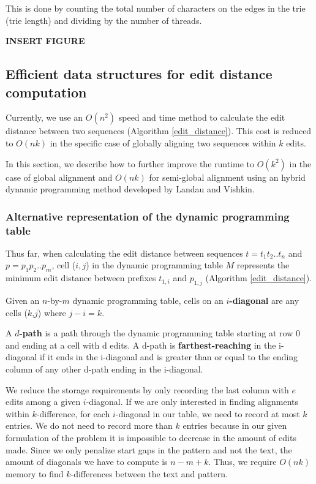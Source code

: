 This is done by counting the total number of characters on the edges in the trie (trie length) and dividing by the number of threads.

{\bf INSERT FIGURE}


\subsection{Efficient data structures for edit distance computation}

Currently, we use an $O(n^2)$ speed and time method to calculate the edit distance between two sequences (Algorithm \ref{edit_distance}).
This cost is reduced to $O(nk)$ in the specific case of globally aligning two sequences within $k$ edits.

In this section, we describe how to further improve the runtime to $O(k^2)$ in the case of global alignment and $O(nk)$ for semi-global alignment using an hybrid dynamic programming method developed by Landau and Vishkin\cite{landau_introducing_1986}.

\subsubsection{Alternative representation of the dynamic programming table}

Thus far, when calculating the edit distance between sequences $t = t_1 t_2 .. t_n$ and $p = p_1 p_2 .. p_m$, cell ($i,j$) in the dynamic programming table $M$ represents the minimum edit distance between prefixes $t_{1,i}$ and $p_{1,j}$ (Algorithm \ref{edit_distance}).

\begin{definition}
Given an $n$-by-$m$ dynamic programming table, cells on an {\bf $i$-diagonal} are any cells ($k$,$j$) where $j-i=k$.
\end{definition}

\begin{definition}
A {\bf $d$-path} is a path through the dynamic programming table starting at row 0 and ending at a cell with d edits.  A d-path is {\bf farthest-reaching} in the i-diagonal if it ends in the i-diagonal and is greater than or equal to the ending column of any other d-path ending in the i-diagonal.
\end{definition}

We reduce the storage requirements by only recording the last column with $e$ edits among a given $i$-diagonal.
If we are only interested in finding alignments within $k$-difference, for each $i$-diagonal in our table, we need to record at most $k$ entries.
We do not need to record more than $k$ entries because in our given formulation of the problem it is impossible to decrease in the amount of edits made.
Since we only penalize start gaps in the pattern and not the text, the amount of diagonals we have to compute is $n - m + k$.
Thus, we require $O(nk)$ memory to find $k$-differences between the text and pattern.

